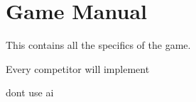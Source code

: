 \chapter{Game Manual}
\hypertarget{md_documentation_2GAME__MANUAL}{}\label{md_documentation_2GAME__MANUAL}
\label{md_documentation_2GAME__MANUAL_autotoc_md21}%
%


This contains all the specifics of the game.

Every competitor will implement

don\textquotesingle{}t use ai 